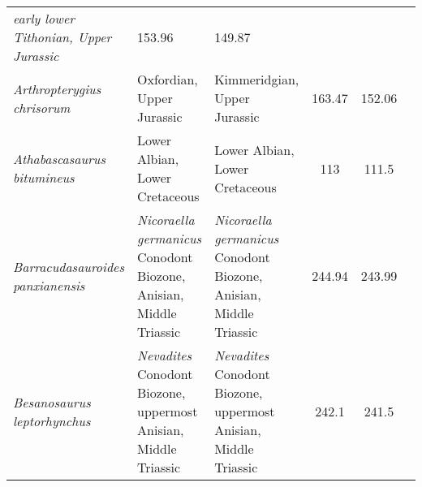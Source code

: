 \begin{longtabu}{>{\itshape}lXXSSl}
        early lower Tithonian, Upper Jurassic
                                                             & 153.96
                                                             & 149.87
                                                             &
                                                             \cite{Bardet2000JP} \\                     
	Arthropterygius chrisorum                            & Oxfordian, Upper
        Jurassic
                                                             & Kimmeridgian,
        Upper Jurassic
                                                             & 163.47
                                                             & 152.06
                                                             &
                                                             \cite{Maxwell2010JVP} \\                    
	Athabascasaurus bitumineus                           & Lower Albian,
        Lower Cretaceous
                                                             & Lower Albian,
        Lower Cretaceous
                                                             & 113
                                                             & 111.5
                                                             &
                                                             \cite{Druckenmiller2010CJES} \\              
	Barracudasauroides panxianensis                      & \emph{Nicoraella
        germanicus} Conodont Biozone, Anisian, Middle Triassic
                                                             & \emph{Nicoraella
        germanicus} Conodont Biozone, Anisian, Middle Triassic
                                                             & 244.94
                                                             & 243.99
                                                             &
                                                             \cite{Jiang2006JVP} \\                      
	Besanosaurus leptorhynchus                           & \emph{Nevadites}
        Conodont Biozone, uppermost Anisian, Middle Triassic
                                                             & \emph{Nevadites}
        Conodont Biozone, uppermost Anisian, Middle Triassic
                                                             & 242.1
                                                             & 241.5
                                                             &
                                                             \cite{DalSasso1996PL} \\                   

\end{longtabu}
